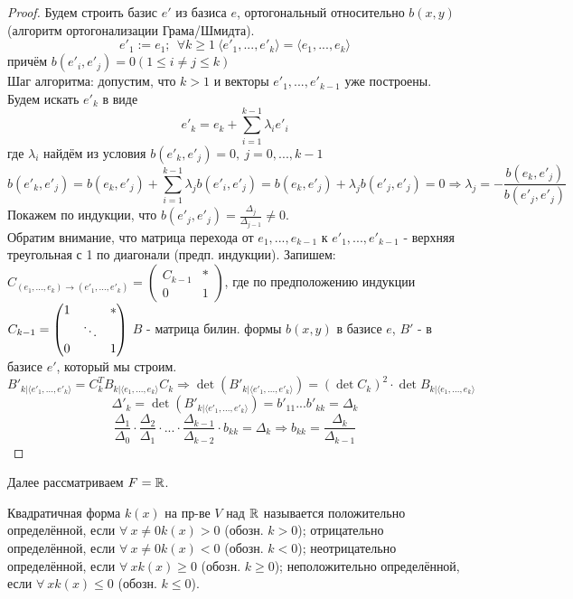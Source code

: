 \begin{proof}
    Будем строить базис $e'$ из базиса $e$, ортогональный относительно $b(x, y)$ (алгоритм ортогонализации Грама/Шмидта).
    $$e'_1 := e_1; \ \ \forall k \geq 1 \ \langle e'_1,...,e'_k\rangle = \langle e_1,...,e_k\rangle$$
    причём $b(e'_i, e'_j) = 0 (1 \leq i \neq j \leq k)$\\
    Шаг алгоритма: допустим, что $k > 1$ и векторы $e'_1,...,e'_{k-1}$ уже построены. Будем искать $e'_{k}$ в виде 
    $$e'_k = e_k + \sum \limits_{i=1}^{k-1} \lambda_i e'_i$$
    где $\lambda_i$  найдём из условия $b(e'_k, e'_j) = 0, \ j = 0,...,k-1$
    $$b(e'_k, e'_j) = b(e_k, e'_j) + \sum \limits_{i=1}^{k-1} \lambda_j b(e'_i, e'_j) = b(e_k, e'_j) + \lambda_j b(e'_j, e'_j) = 0 \Rightarrow \lambda_j = -\frac{b(e_k, e'_j)}{b(e'_j, e'_j)}$$
    Покажем по индукции, что $b(e'_j, e'_j) = \frac{\Delta_j}{\Delta_{j-1}} \neq 0$.\\
    Обратим внимание, что матрица перехода от $e_1,...,e_{k-1}$ к $e'_1,...,e'_{k-1}$ - верхняя треугольная с 1 по диагонали (предп. индукции).
    Запишем: $C_{(e_1,...,e_k)\rightarrow (e'_1,...,e'_k)} = \begin{pmatrix}C_{k-1}&*\\0&1\end{pmatrix}$, где по предположению индукции $C_{k-1} = \begin{pmatrix} 1&\null&* \\ \null&\ddots&\null \\ 0&\null&1 \end{pmatrix}$
    $B$ - матрица билин. формы $b(x, y)$ в базисе $e$, $B'$ - в базисе $e'$, который мы строим.
    $$B'_{k | \langle e'_1,...,e'_k \rangle} = C_k^T B_{k | \langle e_1,...,e_k \rangle} C_k \Rightarrow \det(B'_{k | \langle e'_1,...,e'_k \rangle}) = (\det C_k)^2 \cdot \det B_{k | \langle e_1,...,e_k \rangle}$$
    $$\Delta'_k = \det(B'_{k | \langle e'_1,...,e'_k \rangle}) = b'_{11}...b'_{kk} = \Delta_k$$
    $$\frac{\Delta_1}{\Delta_0}\cdot\frac{\Delta_2}{\Delta_1}\cdot...\cdot\frac{\Delta_{k-1}}{\Delta_{k-2}}\cdot b_{kk} = \Delta_k \Rightarrow b_{kk} = \frac{\Delta_k}{\Delta_{k-1}}$$
\end{proof}
Далее рассматриваем $F = \mathbb{R}$.
\begin{definition}
    Квадратичная форма $k(x)$ на пр-ве $V$ над $\mathbb{R}$ называется положительно определённой, если $\forall \ x \neq 0 k(x) > 0$ (обозн. $k > 0$);
    отрицательно определённой, если $\forall \ x \neq 0 k(x) < 0$ (обозн. $k < 0$);
    неотрицательно определённой, если $\forall \ x  k(x) \geq 0$ (обозн. $k \geq 0$);
    неположительно определённой, если $\forall \ x  k(x) \leq 0$ (обозн. $k \leq 0$).
\end{definition}
